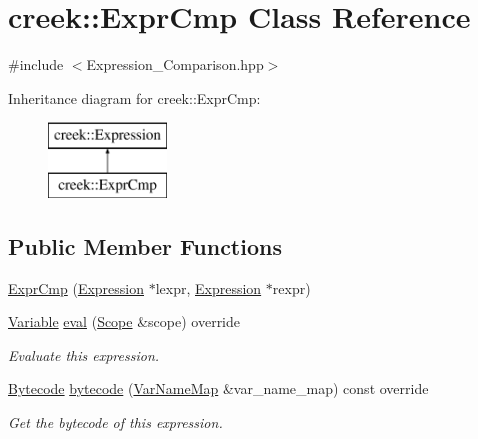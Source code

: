 \hypertarget{classcreek_1_1_expr_cmp}{}\section{creek\+:\+:Expr\+Cmp Class Reference}
\label{classcreek_1_1_expr_cmp}


{\ttfamily \#include $<$Expression\+\_\+\+Comparison.\+hpp$>$}

Inheritance diagram for creek\+:\+:Expr\+Cmp\+:\begin{figure}[H]
\begin{center}
\leavevmode
\includegraphics[height=2.000000cm]{classcreek_1_1_expr_cmp}
\end{center}
\end{figure}
\subsection*{Public Member Functions}
\begin{DoxyCompactItemize}
\item 
\hyperlink{classcreek_1_1_expr_cmp_afe497103a732562cc96101594bf15883}{Expr\+Cmp} (\hyperlink{classcreek_1_1_expression}{Expression} $\ast$lexpr, \hyperlink{classcreek_1_1_expression}{Expression} $\ast$rexpr)
\item 
\hyperlink{classcreek_1_1_variable}{Variable} \hyperlink{classcreek_1_1_expr_cmp_a45d3b9bcf46c7ac302494cbda5caf49e}{eval} (\hyperlink{classcreek_1_1_scope}{Scope} \&scope) override
\begin{DoxyCompactList}\small\item\em Evaluate this expression. \end{DoxyCompactList}\item 
\hyperlink{classcreek_1_1_bytecode}{Bytecode} \hyperlink{classcreek_1_1_expr_cmp_aebc4fe45fd90ffd1c106748ac91bbb78}{bytecode} (\hyperlink{classcreek_1_1_var_name_map}{Var\+Name\+Map} \&var\+\_\+name\+\_\+map) const  override\hypertarget{classcreek_1_1_expr_cmp_aebc4fe45fd90ffd1c106748ac91bbb78}{}\label{classcreek_1_1_expr_cmp_aebc4fe45fd90ffd1c106748ac91bbb78}

\begin{DoxyCompactList}\small\item\em Get the bytecode of this expression. \end{DoxyCompactList}\end{DoxyCompactItemize}



